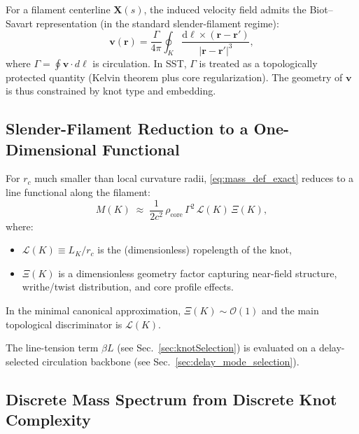 \documentclass[10pt]{article}
\newcommand{\rc}{r_c}                                    %
\newcommand{\rhocore}{\rho_{\text{core}}}
\begin{document}
        For a filament centerline $\mathbf{X}(s)$, the induced velocity field admits the
        Biot--Savart representation (in the standard slender-filament regime):
        \begin{equation}
            \mathbf{v}(\mathbf{r})
            =
            \frac{\Gamma}{4\pi}\oint_K
            \frac{\mathrm{d}\boldsymbol{\ell}\times(\mathbf{r}-\mathbf{r}')}{|\mathbf{r}-\mathbf{r}'|^3},
        \end{equation}
        where $\Gamma=\oint\mathbf{v}\cdot d\boldsymbol{\ell}$ is circulation. In SST,
        $\Gamma$ is treated as a topologically protected quantity (Kelvin theorem plus
        core regularization). The geometry of $\mathbf{v}$ is thus constrained by knot
        type and embedding.

    \subsection{Slender-Filament Reduction to a One-Dimensional Functional}

        For $r_c$ much smaller than local curvature radii, \eqref{eq:mass_def_exact}
        reduces to a line functional along the filament:
        \begin{equation}
            M(K)
            \;\approx\;
            \frac{1}{2c^2}\,
            \rhocore\,\Gamma^2\,\mathcal{L}(K)\,\Xi(K),
            \label{eq:mass_slender}
        \end{equation}
        where:
        \begin{itemize}
            \item $\mathcal{L}(K)\equiv L_K/\rc$ is the (dimensionless) ropelength of the knot,
            \item $\Xi(K)$ is a dimensionless geometry factor capturing near-field structure,
            writhe/twist distribution, and core profile effects.
        \end{itemize}
        In the minimal canonical approximation, $\Xi(K)\sim \mathcal{O}(1)$ and the main
        topological discriminator is $\mathcal{L}(K)$.
        
        The line-tension term $\beta L$ (see Sec.~\ref{sec:knotSelection}) is evaluated on a delay-selected circulation backbone (see Sec.~\ref{sec:delay_mode_selection}).

    \subsection{Discrete Mass Spectrum from Discrete Knot Complexity}
\end{document}
